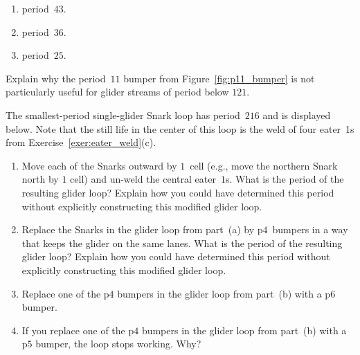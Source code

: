 \begin{multicols}{2}
\begin{problem}
		\begin{enumerate}[label=\bf\color{ocre}(\alph*)]
			\item period~$43$.
			
			\item period~$36$.
			
			\item period~$25$.
		\end{enumerate}
	\end{problem}
	
	
	\mfilbreak
	
	
	\begin{problemstar}\label{exer:p11_bumper_not_useful} 
		Explain why the period~$11$ bumper from Figure~\ref{fig:p11_bumper} is not particularly useful for glider streams of period below $121$.
		
	\end{problemstar}
	
	
	\mfilbreak
	
	
	\begin{problemstar}\label{exer:minimum_period_snark_loop}
		The smallest-period single-glider Snark loop has period~$216$ and is displayed below. Note that the still life in the center of this loop is the weld of four eater~1s from Exercise~\ref{exer:eater_weld}(c).\smallskip
		
		\begin{enumerate}[label=\bf\color{ocre}(\alph*)]
			\item {} Move each of the Snarks outward by $1$~cell (e.g., move the northern Snark north by $1$ cell) and un-weld the central eater~$1$s. What is the period of the resulting glider loop? Explain how you could have determined this period without explicitly constructing this modified glider loop.
			
			\item {} Replace the Snarks in the glider loop from part~(a) by p$4$~bumpers in a way that keeps the glider on the same lanes. What is the period of the resulting glider loop? Explain how you could have determined this period without explicitly constructing this modified glider loop.
			
			\item {} Replace one of the p$4$ bumpers in the glider loop from part~(b) with a p$6$ bumper.
			
			\item {} If you replace one of the p$4$ bumpers in the glider loop from part~(b) with a p$5$ bumper, the loop stops working. Why?
			

\end{enumerate}
\end{problemstar}
\end{multicols}
